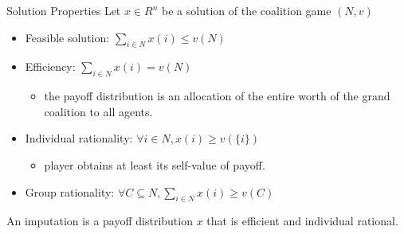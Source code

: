 \documentclass{beamer}
\begin{document}
\begin{frame}{Solution Properties}
    Let $x \in R^n$ be a solution of the coalition game $(N,v)$
    \begin{itemize}
        \item {\color{blue} Feasible solution:} $\sum_{i \in N} x(i) \leq v(N)$
        \item {\color{blue} Efficiency:} $\sum_{i \in N} x(i) = v(N)$
        \begin{itemize}
            \item the payoff distribution is an allocation of the entire worth of the grand coalition to all agents.
        \end{itemize}
        \item {\color{blue} Individual rationality:} $\forall i \in N, x(i) \geq v(\{i\})$
        \begin{itemize}
            \item player obtains at least its self-value of payoff.
        \end{itemize}
        \item {\color{blue} Group rationality:} $\forall C \subseteq N, \sum_{i \in N} x(i) \geq v(C)$
    \end{itemize}

    \vspace{0.2cm}

    An {\color{blue} imputation} is a payoff distribution $x$ that is efficient and individual rational.

\end{frame}
\end{document}

